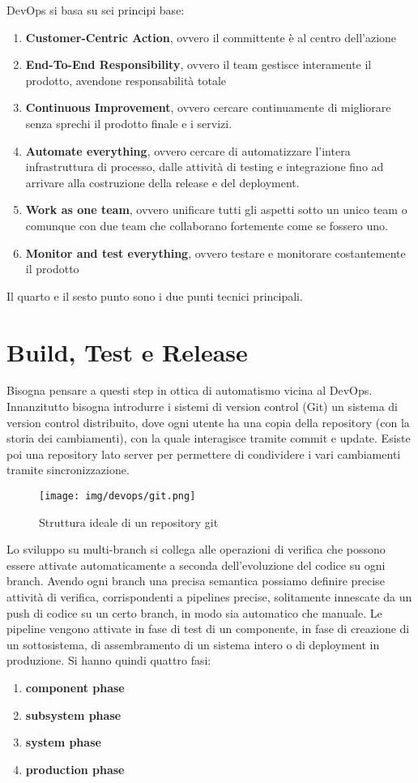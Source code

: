 DevOps si basa su sei principi base:
\begin{enumerate}
    \item \textbf{Customer-Centric Action}, ovvero il committente è al centro dell’azione
    \item \textbf{End-To-End Responsibility}, ovvero il team gestisce interamente il prodotto, avendone responsabilità totale
    \item \textbf{Continuous Improvement}, ovvero cercare continuamente di migliorare senza sprechi il prodotto finale e i servizi.
    \item \textbf{Automate everything}, ovvero cercare di automatizzare l’intera infrastruttura di processo, dalle attività di testing e integrazione fino ad arrivare alla costruzione della release e del deployment.
    \item \textbf{Work as one team}, ovvero unificare tutti gli aspetti sotto un unico team o comunque con due team che collaborano fortemente come se fossero uno.
    \item \textbf{Monitor and test everything}, ovvero testare e monitorare costantemente il prodotto
\end{enumerate}
 
Il quarto e il sesto punto sono i due punti tecnici principali.
\section{Build, Test e Release}
Bisogna pensare a questi step in ottica di automatismo vicina al DevOps. Innanzitutto bisogna introdurre i sistemi di version control (Git) un sistema di version control distribuito, dove ogni utente ha una copia della repository (con la storia dei cambiamenti), con la quale interagisce tramite commit e update. Esiste poi una repository lato server per permettere di condividere i vari cambiamenti tramite sincronizzazione.

\begin{figure}[!ht]
    \centering
    \texttt{[image: img/devops/git.png]}
    \caption{Struttura ideale di un repository git}
    \label{fig:git}
\end{figure}

Lo sviluppo su multi-branch si collega alle operazioni di verifica che possono essere attivate automaticamente a seconda dell’evoluzione del codice su ogni branch. Avendo ogni branch una precisa semantica possiamo definire precise attività di verifica, corrispondenti a pipelines precise, solitamente innescate da un push di codice su un certo branch, in modo sia automatico che manuale.
Le pipeline vengono attivate in fase di test di un componente, in fase di creazione di un sottosistema, di assembramento di un sistema intero o di deployment in produzione. Si hanno quindi quattro fasi:
\begin{enumerate}
    \item \textbf{component phase}
    \item \textbf{subsystem phase}
    \item \textbf{system phase}
    \item \textbf{production phase}
\end{enumerate}

